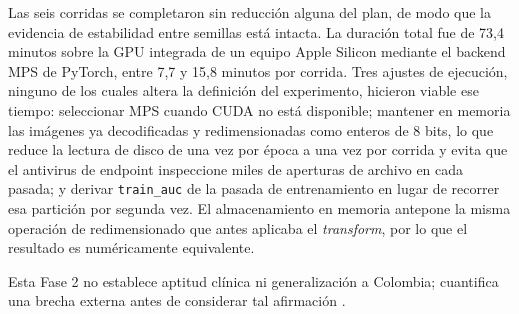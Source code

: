 \documentclass[11pt]{article}
\begin{document}
Las seis corridas se completaron sin reducción alguna del plan, de modo que la evidencia de estabilidad entre semillas está intacta. La duración total fue de 73,4 minutos sobre la GPU integrada de un equipo Apple Silicon mediante el backend MPS de PyTorch, entre 7,7 y 15,8 minutos por corrida. Tres ajustes de ejecución, ninguno de los cuales altera la definición del experimento, hicieron viable ese tiempo: seleccionar MPS cuando CUDA no está disponible; mantener en memoria las imágenes ya decodificadas y redimensionadas como enteros de 8 bits, lo que reduce la lectura de disco de una vez por época a una vez por corrida y evita que el antivirus de endpoint inspeccione miles de aperturas de archivo en cada pasada; y derivar \texttt{train\_auc} de la pasada de entrenamiento en lugar de recorrer esa partición por segunda vez. El almacenamiento en memoria antepone la misma operación de redimensionado que antes aplicaba el \emph{transform}, por lo que el resultado es numéricamente equivalente.

Esta Fase 2 no establece aptitud clínica ni generalización a Colombia; cuantifica una brecha externa antes de considerar tal afirmación \parencite{zech2018}.
\printbibliography
\end{document}
